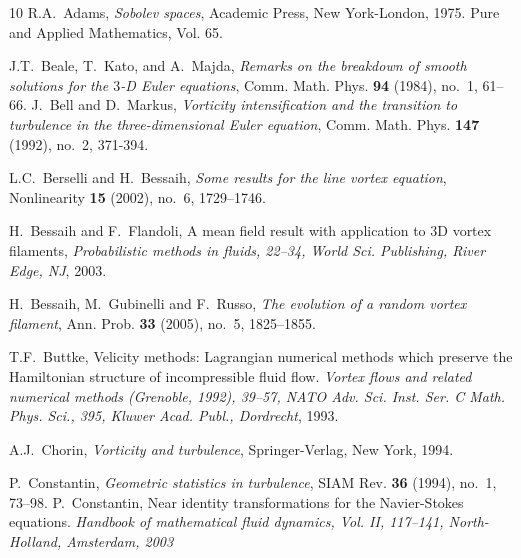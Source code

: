 \documentclass[a4paper,11pt]{article}
\numberwithin{equation}{section}
\begin{document}
\begin{thebibliography}{10}
R.A.~Adams, \emph{Sobolev spaces}, Academic Press, New
York-London, 1975. Pure and Applied Mathematics, Vol. 65.

J.T.~Beale, T.~Kato, and A.~Majda, \emph{Remarks on the breakdown of
  smooth solutions for the $3$-{D} {E}uler equations},
  Comm. Math. Phys. \textbf{94} (1984), no.~1, 61--66. %
%
%
J.~Bell and D.~Markus, \emph{Vorticity intensification and the
transition to turbulence in the three-dimensional Euler equation},
Comm. Math. Phys.  {\bf 147} (1992), no.~2, 371-394.

L.C.~Berselli and H.~Bessaih, \emph{Some results for the line vortex
  equation}, {Nonlinearity} \textbf{15} (2002), no.~6, 1729--1746.


H.~Bessaih and F.~Flandoli, A mean field result with application to 3D
vortex filaments, \emph{Probabilistic methods in fluids, 22--34, World
Sci. Publishing, River Edge, NJ}, 2003.
 
H.~Bessaih, M.~Gubinelli and F.~Russo, \emph{The evolution of a random
    vortex filament}, Ann. Prob. \textbf{33} (2005), no.~5,
  1825--1855. 

T.F.~Buttke, Velicity methods: Lagrangian numerical methods which
preserve the Hamiltonian structure of incompressible fluid
flow. \emph{Vortex flows and related numerical methods (Grenoble,
  1992), 39--57, NATO Adv. Sci. Inst. Ser. C Math. Phys. Sci., 395,
  Kluwer Acad. Publ., Dordrecht}, 1993. 

A.J.~Chorin, \emph{Vorticity and turbulence}, Springer-Verlag, New
  York, 1994.

P.~Constantin, \emph{Geometric statistics in turbulence}, SIAM Rev.
  \textbf{36} (1994), no.~1, 73--98.%
P.~Constantin, Near identity transformations for the Navier-Stokes
  equations.  \textit{Handbook of mathematical fluid dynamics, Vol.
  II, 117--141, North-Holland, Amsterdam, 2003}


\end{thebibliography}
\end{document}
